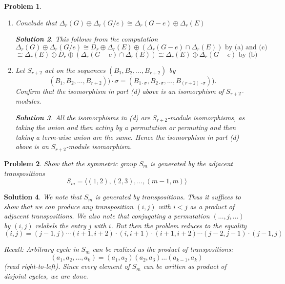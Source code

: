 \documentclass{article}
\theoremstyle{normal}
\newtheorem{problem}{Problem}
\theoremstyle{thmit}
\newtheorem*{solution}{Solution}
\begin{document}
\begin{problem}
\begin{enumerate}
\begin{solution}
\end{solution}
    \item[(d)] Conclude that $\Delta_r(G) \oplus \Delta_r(G/e)\cong \Delta_r(G-e)\oplus\Delta_r(E)$
    \begin{solution}
This follows from the computation $$\Delta_r(G)\oplus\Delta_r(G/e) \cong D_r \oplus \Delta_r(E) \oplus\left(\Delta_r(G-e)\cap \Delta_r(E) \right) \text{ by (a) and (c)}$$ $$ \cong \Delta_r(E) \oplus D_r \oplus\left(\Delta_r(G-e)\cap \Delta_r(E) \right) \cong \Delta_r(E) \oplus \Delta_r(G-e) \text{ by (b)}$$
\end{solution}
\item[(e)] Let $S_{r+2}$ act on the sequences $(B_1,B_2,\dots,B_{r+2})$ by $$(B_1,B_2,\dots,B_{r+2}))\cdot\sigma = (B_{1\cdot\sigma},B_{2\cdot\sigma},\dots,B_{(r+2)\cdot\sigma})).$$ Confirm that the isomorphism in part (d) above is an isomorphism of $S_{r+2}$-modules.
\begin{solution}
All the isomorphisms in (d) are $S_{r+2}$-module isomorphisms, as taking the union and then acting by a permutation or permuting and then taking a term-wise union are the same. Hence the isomorphism in part (d) above is an $S_{r+2}$-module isomorphism.
\end{solution}
\end{enumerate}
\end{problem}



\begin{problem}
Show that the symmetric group $S_m$ is generated by the adjacent transpositions $$S_m = \langle (1,2), (2,3),\dots,(m-1,m)\rangle$$
\end{problem}
\begin{solution}
We note that $S_m$ is generated by transpositions. Thus it suffices to show that we can produce any transposition $(i,j)$ with $i<j$ as a product of adjacent transpositions. We also note that conjugating a permutation $(\dots,j,\dots)$ by $(i,j)$ relabels the entry $j$ with $i$. But then the problem reduces to the equality $$(i,j) = (j-1,j)\cdots(i+1,i+2)\cdot(i,i+1)\cdot(i+1,i+2)\cdots(j-2,j-1)\cdot(j-1,j)$$


Recall: Arbitrary cycle in $S_m$ can be realized as the product of transpositions: 
\[(a_1, a_2, \dots, a_k) = (a_1, a_2)(a_2, a_3) \dots (a_{k-1}, a_k)\]
(read right-to-left). Since every element of $S_m$ can be written as product of disjoint cycles, we are done.

\end{solution}
\end{document}
